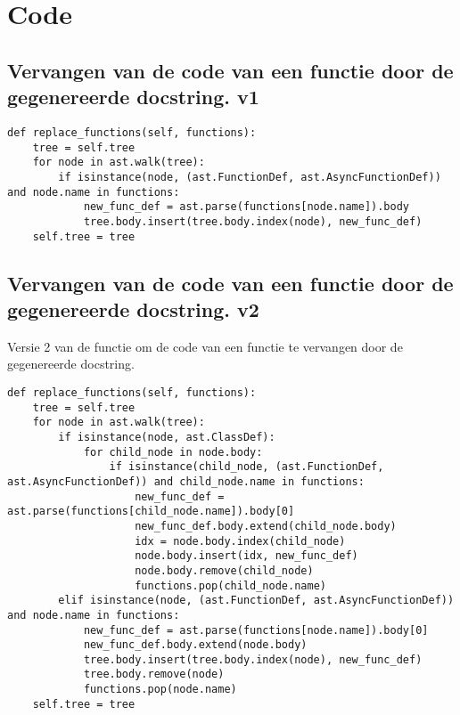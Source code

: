 \section{Code}
\label{bijlage:code}

\subsection{Vervangen van de code van een functie door de gegenereerde docstring. v1}
\label{bijlage:vervangen-v1}
\begin{verbatim}
def replace_functions(self, functions):
    tree = self.tree
    for node in ast.walk(tree):
        if isinstance(node, (ast.FunctionDef, ast.AsyncFunctionDef)) and node.name in functions:
            new_func_def = ast.parse(functions[node.name]).body
            tree.body.insert(tree.body.index(node), new_func_def)        
    self.tree = tree
\end{verbatim}

\subsection{Vervangen van de code van een functie door de gegenereerde docstring. v2}
\label{bijlage:vervangen-v2}
Versie 2 van de functie om de code van een functie te vervangen door de gegenereerde docstring.
\begin{verbatim}
def replace_functions(self, functions):
    tree = self.tree
    for node in ast.walk(tree):
        if isinstance(node, ast.ClassDef):
            for child_node in node.body:
                if isinstance(child_node, (ast.FunctionDef, ast.AsyncFunctionDef)) and child_node.name in functions:
                    new_func_def = ast.parse(functions[child_node.name]).body[0]
                    new_func_def.body.extend(child_node.body)
                    idx = node.body.index(child_node)
                    node.body.insert(idx, new_func_def)
                    node.body.remove(child_node)
                    functions.pop(child_node.name)
        elif isinstance(node, (ast.FunctionDef, ast.AsyncFunctionDef)) and node.name in functions:
            new_func_def = ast.parse(functions[node.name]).body[0]
            new_func_def.body.extend(node.body)
            tree.body.insert(tree.body.index(node), new_func_def)
            tree.body.remove(node)
            functions.pop(node.name)
    self.tree = tree
\end{verbatim}

